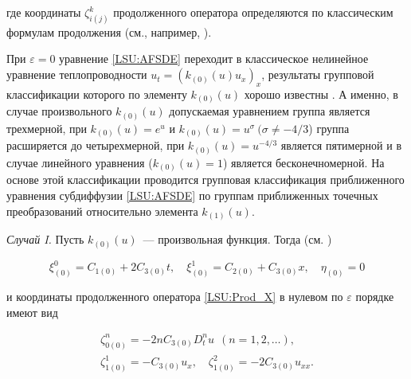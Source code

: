 где координаты $\zeta_{i(j)}^k$ продолженного оператора определяются по классическим формулам продолжения (см., например, \cite{LSU:Ovs, LSU:Ibr}).



При $\varepsilon=0$ уравнение \eqref{LSU:AFSDE} переходит в классическое нелинейное уравнение теплопроводности $u_t=(k_{(0)}(u)u_x)_x$, результаты групповой классификации которого по элементу $k_{(0)}(u)$ хорошо известны \cite{LSU:Ovs}. А именно, в случае произвольного $k_{(0)}(u)$ допускаемая уравнением группа является трехмерной, при $k_{(0)}(u)=e^u$ и $k_{(0)}(u)=u^{\sigma} \ (\sigma \neq -4/3$) группа расширяется до четырехмерной, при $k_{(0)}(u)=u^{-4/3}$ является пятимерной и в случае линейного уравнения ($k_{(0)}(u)=1$) является бесконечномерной. На основе этой классификации проводится групповая классификация приближенного уравнения субдиффузии \eqref{LSU:AFSDE} по группам приближенных точечных преобразований относительно элемента $k_{(1)}(u)$.



\vspace{2mm}

\textit{Случай I.} Пусть $k_{(0)}(u)$~--- произвольная функция. Тогда (см. \cite{LSU:Ovs})

\begin{equation}

\label{LSU:X0_k}

\xi^0_{(0)} = C_{1(0)}+2C_{3(0)}t, \quad  \xi^1_{(0)} = C_{2(0)}+C_{3(0)}x, \quad \eta_{(0)} = 0

\end{equation}

и координаты продолженного оператора \eqref{LSU:Prod_X} в нулевом по $\varepsilon$ порядке имеют вид

\begin{equation}

\label{LSU:P14_E41}

\begin{array}{l}

\zeta_{0(0)}^n =-2n C_{3(0)} D^n_t u \ \ (n=1,2,\ldots), \\[1ex]

\zeta_{1(0)}^1 = -C_{3(0)} u_x, \quad

\zeta_{1(0)}^2 = -2C_{3(0)} u_{xx}.

\end{array}

\end{equation}




